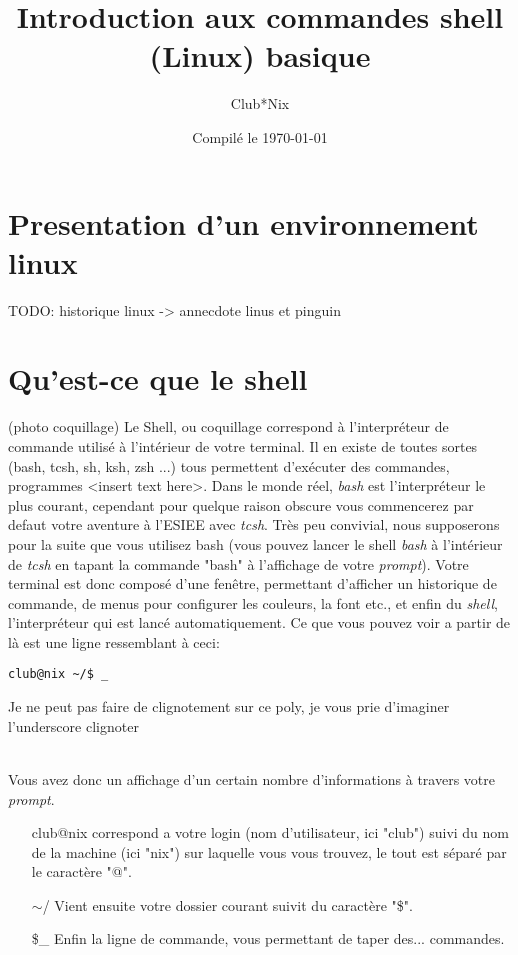 \documentclass[french, a4paper, 12pt, titlepage]{article}
\begin{document}
\title{Introduction aux commandes shell (Linux) basique}
\author{Club*Nix}
\date{Compilé le \today}

\maketitle

\vfill
\pagebreak

\newpage
\strut\thispagestyle{empty}
\vfill
\pagebreak
\tableofcontents
\strut\thispagestyle{empty}
\newpage
\setcounter{page}{1}

\section{Presentation d'un environnement linux}
TODO: historique linux
-> annecdote linus et pinguin

\section{Qu'est-ce que le shell}
(photo coquillage)
Le Shell, ou coquillage correspond à l'interpréteur de commande utilisé à l'intérieur de votre terminal.
Il en existe de toutes sortes (bash, tcsh, sh, ksh, zsh ...) tous permettent d'exécuter des commandes, programmes <insert text here>.
Dans le monde réel, \emph{bash} est l'interpréteur le plus courant, cependant pour quelque raison obscure vous commencerez par defaut votre aventure à l'ESIEE avec \emph{tcsh}.
Très peu convivial, nous supposerons pour la suite que vous utilisez bash (vous pouvez lancer le shell \emph{bash} à l'intérieur de \emph{tcsh} en tapant la commande "bash" à l'affichage de votre \emph{prompt}).
Votre terminal est donc composé d'une fenêtre, permettant d'afficher un historique de commande, de menus pour configurer les couleurs, la font etc., et enfin du \emph{shell}, l'interpréteur qui est lancé automatiquement.
Ce que vous pouvez voir a partir de là est une ligne ressemblant à ceci:
\begin{lstlisting}
club@nix ~/$ _
\end{lstlisting}
\begin{tiny}
Je ne peut pas faire de clignotement sur ce poly, je vous prie d'imaginer l'underscore clignoter
\end{tiny}\\
Vous avez donc un affichage d'un certain nombre d'informations à travers votre \emph{prompt}.
\begin{enumerate}
\item[club@nix] correspond a votre login (nom d'utilisateur, ici "club") suivi du nom de la machine (ici "nix") sur laquelle vous vous trouvez, le tout est séparé par le caractère "@".
\item[$\sim$/] Vient ensuite votre dossier courant suivit du caractère "\$".
\item[\$\_] Enfin la ligne de commande, vous permettant de taper des... commandes.
\end{enumerate}
\end{document}
